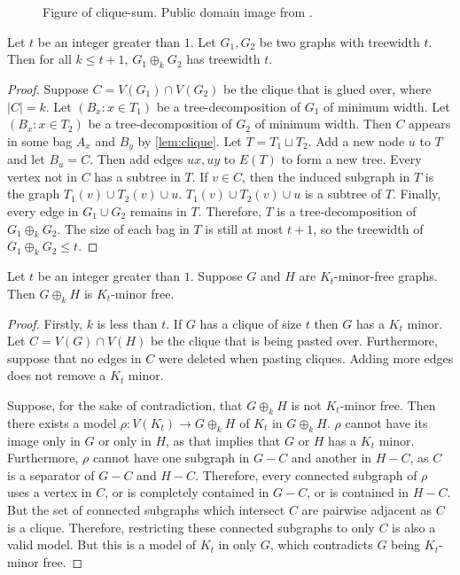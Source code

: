 \begin{figure}[h]
	\centering
	
	\caption[Clique-sum]{Figure of clique-sum. Public domain image from \textcite{eppsteinCliquesum2023}.}\label{fig:clique-sum}
\end{figure}


\begin{proposition}
	Let $t$ be an integer greater than $ 1$. Let $G_1, G_2$ be two graphs with treewidth $t$. Then for all $k \leq t + 1$, $G_1 \oplus_k G_2$ has treewidth $t$. 
\end{proposition}
\begin{proof}
	Suppose $C = V(G_1) \cap V(G_2)$ be the clique that is glued over, where $|C| = k$. Let $(B_x: x \in T_1)$ be a tree-decomposition of $G_1$ of minimum width. Let $(B_x : x \in T_2)$ be a tree-decomposition of $G_2$ of minimum width. Then $C$ appears in some bag $A_x$ and $B_y$ by \cref{lem:clique}. Let $T = T_1 \sqcup T_2$. Add a new node $u$ to $T$ and let $B_u = C$. Then add edges $ux, uy$ to $E(T)$ to form a new tree. Every vertex not in $C$ has a subtree in $T$. If $v \in C$, then the induced subgraph in $T$ is the graph $T_1(v) \cup T_2(v) \cup u$. $T_1(v) \cup T_2(v) \cup u$ is a subtree of $T$. Finally, every edge in $G_1 \cup G_2$ remains in $T$. Therefore, $T$ is a tree-decomposition of $G_1 \oplus_k G_2$. The size of each bag in $T$ is still at most $t + 1$, so the treewidth of $G_1 \oplus_k G_2 \leq t$.
\end{proof}

\begin{proposition}
	Let $t$ be an integer greater than $1$. Suppose $G$ and $H$ are $K_t$-minor-free graphs. Then $G \oplus_k H$ is $K_{t}$-minor free. 
\end{proposition}
\begin{proof}
	Firstly, $k$ is less than $t$. If $G$ has a clique of size $t$ then $G$ has a $K_t$ minor. Let $C = V(G) \cap V(H)$ be the clique that is being pasted over. Furthermore, suppose that no edges in $C$ were deleted when pasting cliques. Adding more edges does not remove a $K_t$ minor. 

	Suppose, for the sake of contradiction, that $G \oplus_k H$ is not $K_t$-minor free. Then there exists a model $\rho: V(K_t) \rightarrow G\oplus_k H$ of $K_t$ in $G \oplus_k H$. $\rho$ cannot have its image only in $G$ or only in $H$, as that implies that $G$ or $H$ has a $K_t$ minor. Furthermore, $\rho$ cannot have one subgraph in $G - C$ and another in $H - C$, as $C$ is a separator of $G - C$ and $H - C$.
	Therefore, every connected subgraph of $\rho$ uses a vertex in $C$, or is completely contained in $G - C$, or is contained in $H - C$. But the set of connected subgraphs which intersect $C$ are pairwise adjacent as $C$ is a clique. Therefore, restricting these connected subgraphs to only $C$ is also a valid model. But this is a model of $K_t$ in only $G$, which contradicts $G$ being $K_t$-minor free. 
\end{proof}
